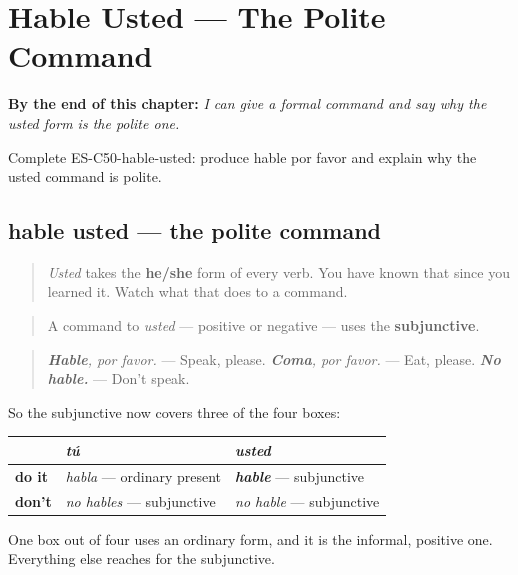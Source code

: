 
\chapter{Hable Usted --- The Polite Command}
\label{ch:command-usted}

\begin{chapteropening}
\textbf{By the end of this chapter:} \emph{I can give a formal command and say why the usted form is the polite one.}

Complete ES-C50-hable-usted: produce hable por favor and explain why the usted command is polite.
\end{chapteropening}

\section[hable usted]{hable usted — the polite command}

\label{lesson:ES-C50-hable-usted}



\begin{quote}
\emph{Usted} takes the \textbf{he/she} form of every verb. You have known that since you learned it. Watch what that does to a command.
\end{quote}

\begin{grammarlens}[title={Grammar Lens: the subjunctive, a third time}]
\begin{quote}
A command to \emph{usted} — positive or negative — uses the \textbf{subjunctive}.
\end{quote}

\begin{quote}
\emph{\textbf{Hable}, por favor.} — Speak, please. \emph{\textbf{Coma}, por favor.} — Eat, please. \emph{\textbf{No hable.}} — Don't speak.
\end{quote}

So the subjunctive now covers three of the four boxes:

\noindent
\begin{tabularx}{\linewidth}{@{}>{\raggedright\arraybackslash}X>{\raggedright\arraybackslash}X>{\raggedright\arraybackslash}X@{}}
\toprule
\textbf{} & \textbf{\emph{tú}} & \textbf{\emph{usted}} \\
\midrule
\textbf{do it} & \emph{habla} — ordinary present & \emph{\textbf{hable}} — subjunctive \\
\textbf{don't} & \emph{no hables} — subjunctive & \emph{no hable} — subjunctive \\
\bottomrule
\end{tabularx}

One box out of four uses an ordinary form, and it is the informal, positive one. Everything else reaches for the subjunctive.
\end{grammarlens}

